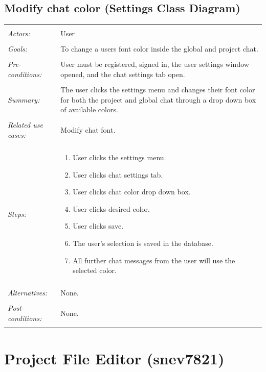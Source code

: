 \documentclass[11pt]{report}
\begin{document}
\subsection{Modify chat color (Settings Class Diagram)}
\begin{tabular}{ p{2cm} p{12cm} }
 \hline
 \\
 \textit{Actors:} & User \\ 
 \\
 \textit{Goals:} & To change a users font color inside the global and project chat. \\
 \\
 \textit{Pre-conditions:} & User must be registered, signed in, the user settings window opened, and the chat settings tab open.  \\
 \\
 \textit{Summary:} & The user clicks the settings menu and changes their font color for both the project and global chat through a drop down box of available colors. \\ 
 \\
 \textit{Related use cases:} & Modify chat font. \\ 
 \\
 \textit{Steps:} & \begin{enumerate}
  \item User clicks the settings menu.
  \item User clicks chat settings tab.
  \item User clicks chat color drop down box.
  \item User clicks desired color.
  \item User clicks save.
  \item The user's selection is saved in the database.
  \item All further chat messages from the user will use the selected color.
 \end{enumerate} \\
 \\
 \textit{Alternatives:} & None. \\
 \\
 \textit{Post-conditions:} & None. \\
 \\
\hline
\end{tabular}

\section{Project File Editor (snev7821)}
\end{document}
